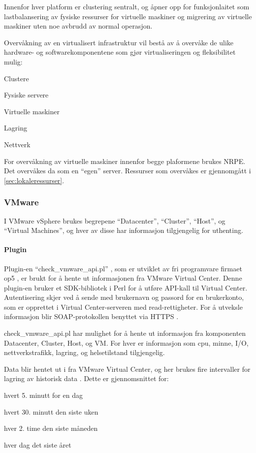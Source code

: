 Innenfor hver platform er clustering sentralt, og åpner opp for funksjonlaitet som lastbalansering av fysiske ressurser for virtuelle maskiner og migrering av virtuelle maskiner uten noe avbrudd av normal operasjon.

Overvåkning av en virtualisert infrastruktur vil bestå av å overvåke de ulike hardware- og softwarekomponentene som gjør virtualiseringen og fleksibilitet mulig: 
\begin{itemize*}
	\item Clustere
	\item Fysiske servere
	\item Virtuelle maskiner
	\item Lagring 
	\item Nettverk 
\end{itemize*}

For overvåkning av virtuelle maskiner innenfor begge plaformene brukes NRPE. Det overvåkes da som en ``egen'' server. Ressurser som overvåkes er gjennomgått i \ref{sec:lokaleressurser}.

\subsubsection{VMware}
I VMware vSphere brukes begrepene ``Datacenter'', ``Cluster'', ``Host'', og ``Virtual Machines'', og hver av disse har informasjon tilgjengelig for uthenting. 

\paragraph{Plugin}
Plugin-en ``check\_vmware\_api.pl'' , som er utviklet av fri programvare firmaet op5 \cite{op5}, er brukt for å hente ut informasjonen fra VMware Virtual Center. Denne plugin-en bruker et SDK-bibliotek i Perl \cite{vmwareperl} for å utføre API-kall til Virtual Center. Autentisering skjer ved å sende med brukernavn og passord for en brukerkonto, som er opprettet i Virtual Center-serveren med read-rettigheter. For å utveksle informasjon blir SOAP-protokollen benyttet \cite{wiki:soap} via HTTPS \cite{ciscovirtual}.

check\_vmware\_api.pl har mulighet for å hente ut informasjon fra komponenten Datacenter, Cluster, Host, og VM. For hver er informasjon som cpu, minne, I/O, nettverkstrafikk, lagring, og helsetilstand tilgjengelig.

Data blir hentet ut i fra VMware Virtual Center, og her brukes fire intervaller for lagring av historisk data \cite{vmwareperf}. Dette er gjennomsnittet for:
\begin{enumerate*}
        \item hvert 5. minutt for en dag
        \item hvert 30. minutt den siste uken
        \item hver 2. time den siste måneden
        \item hver dag det siste året
\end{enumerate*}

